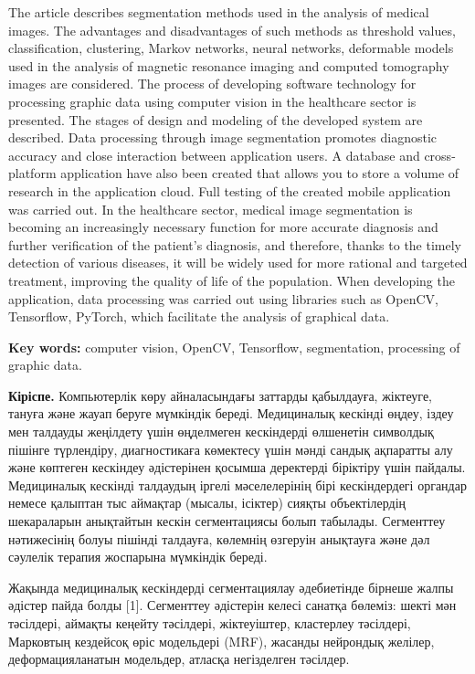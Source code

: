 The article describes segmentation methods used in the analysis of
medical images. The advantages and disadvantages of such methods as
threshold values, classification, clustering, Markov networks, neural
networks, deformable models used in the analysis of magnetic resonance
imaging and computed tomography images are considered. The process of
developing software technology for processing graphic data using
computer vision in the healthcare sector is presented. The stages of
design and modeling of the developed system are described. Data
processing through image segmentation promotes diagnostic accuracy and
close interaction between application users. A database and
cross-platform application have also been created that allows you to
store a volume of research in the application cloud. Full testing of the
created mobile application was carried out. In the healthcare sector,
medical image segmentation is becoming an increasingly necessary
function for more accurate diagnosis and further verification of the
patient's diagnosis, and therefore, thanks to the timely detection of
various diseases, it will be widely used for more rational and targeted
treatment, improving the quality of life of the population. When
developing the application, data processing was carried out using
libraries such as OpenCV, Tensorflow, PyTorch, which facilitate the
analysis of graphical data.

{\bfseries Key words:} computer vision, OpenCV, Tensorflow, segmentation,
processing of graphic data.

{\bfseries Кіріспе.} Компьютерлік көру айналасындағы заттарды қабылдауға,
жіктеуге, тануға және жауап беруге мүмкіндік береді. Медициналық
кескінді өңдеу, іздеу мен талдауды жеңілдету үшін өңделмеген кескіндерді
өлшенетін символдық пішінге түрлендіру, диагностикаға көмектесу үшін
мәнді сандық ақпаратты алу және көптеген кескіндеу әдістерінен қосымша
деректерді біріктіру үшін пайдалы. Медициналық кескінді талдаудың іргелі
мәселелерінің бірі кескіндердегі органдар немесе қалыптан тыс аймақтар
(мысалы, ісіктер) сияқты объектілердің шекараларын анықтайтын кескін
сегментациясы болып табылады. Сегменттеу нәтижесінің болуы пішінді
талдауға, көлемнің өзгеруін анықтауға және дәл сәулелік терапия
жоспарына мүмкіндік береді.

Жақында медициналық кескіндерді сегментациялау әдебиетінде бірнеше жалпы
әдістер пайда болды {[}1{]}. Сегменттеу әдістерін келесі санатқа
бөлеміз: шекті мән тәсілдері, аймақты кеңейту тәсілдері, жіктеуіштер,
кластерлеу тәсілдері, Марковтың кездейсоқ өріс модельдері (MRF), жасанды
нейрондық желілер, деформацияланатын модельдер, атласқа негізделген
тәсілдер.


